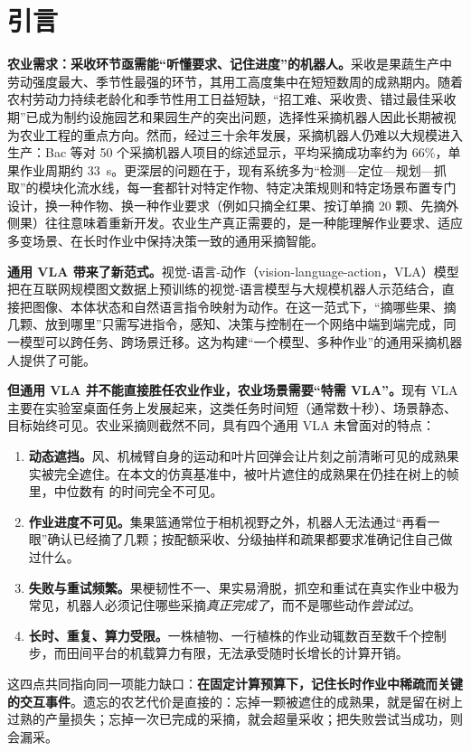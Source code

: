 \section{引言}
\label{sec:intro}

\textbf{农业需求：采收环节亟需能“听懂要求、记住进度”的机器人。}采收是果蔬生产中劳动强度最大、季节性最强的环节，其用工高度集中在短短数周的成熟期内。随着农村劳动力持续老龄化和季节性用工日益短缺，“招工难、采收贵、错过最佳采收期”已成为制约设施园艺和果园生产的突出问题，选择性采摘机器人因此长期被视为农业工程的重点方向\cite{bac2014harvesting,kootstra2021selective,zhou2022intelligent}。然而，经过三十余年发展，采摘机器人仍难以大规模进入生产：Bac 等对 50 个采摘机器人项目的综述显示，平均采摘成功率约为 66\%，单果作业周期约 33~s\cite{bac2014harvesting}。更深层的问题在于，现有系统多为“检测—定位—规划—抓取”的模块化流水线\cite{arad2020sweetpepper,williams2019kiwifruit,silwal2017apple}，每一套都针对特定作物、特定决策规则和特定场景布置专门设计，换一种作物、换一种作业要求（例如只摘全红果、按订单摘 20 颗、先摘外侧果）往往意味着重新开发。农业生产真正需要的，是一种能理解作业要求、适应多变场景、在长时作业中保持决策一致的通用采摘智能。



\textbf{通用 VLA 带来了新范式。}视觉-语言-动作（vision-language-action，VLA）模型把在互联网规模图文数据上预训练的视觉-语言模型与大规模机器人示范结合，直接把图像、本体状态和自然语言指令映射为动作\cite{brohan2023rt1,brohan2023rt2,octo2024,kim2024openvla,black2024pi0,pi05_2025}。在这一范式下，“摘哪些果、摘几颗、放到哪里”只需写进指令，感知、决策与控制在一个网络中端到端完成，同一模型可以跨任务、跨场景迁移。这为构建“一个模型、多种作业”的通用采摘机器人提供了可能。

\textbf{但通用 VLA 并不能直接胜任农业作业，农业场景需要“特需 VLA”。}现有 VLA 主要在实验室桌面任务上发展起来，这类任务时间短（通常数十秒）、场景静态、目标始终可见。农业采摘则截然不同，具有四个通用 VLA 未曾面对的特点：
\begin{enumerate}
\item \textbf{动态遮挡。}风、机械臂自身的运动和叶片回弹会让片刻之前清晰可见的成熟果实被完全遮住\cite{hemming2014detectability}。在本文的仿真基准中，被叶片遮住的成熟果在仍挂在树上的帧里，中位数有  的时间完全不可见。
\item \textbf{作业进度不可见。}集果篮通常位于相机视野之外，机器人无法通过“再看一眼”确认已经摘了几颗；按配额采收、分级抽样和疏果都要求准确记住自己做过什么。
\item \textbf{失败与重试频繁。}果梗韧性不一、果实易滑脱，抓空和重试在真实作业中极为常见，机器人必须记住哪些采摘\emph{真正完成了}，而不是哪些动作\emph{尝试过}。
\item \textbf{长时、重复、算力受限。}一株植物、一行植株的作业动辄数百至数千个控制步，而田间平台的机载算力有限，无法承受随时长增长的计算开销。
\end{enumerate}
这四点共同指向同一项能力缺口：\textbf{在固定计算预算下，记住长时作业中稀疏而关键的交互事件}。遗忘的农艺代价是直接的：忘掉一颗被遮住的成熟果，就是留在树上过熟的产量损失；忘掉一次已完成的采摘，就会超量采收；把失败尝试当成功，则会漏采。

